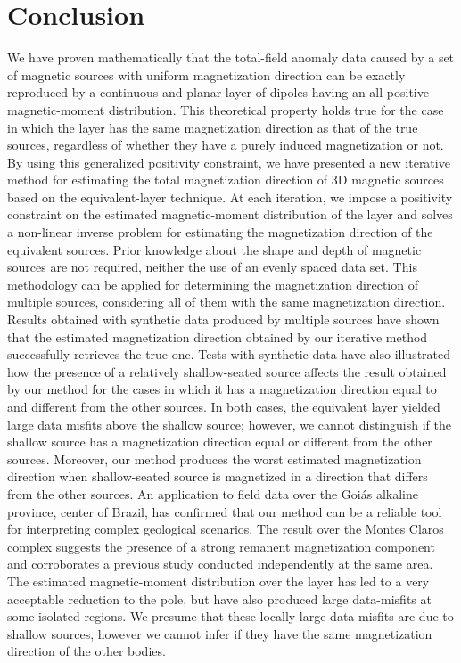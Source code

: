\section{Conclusion}
\label{sec:conclusion}

We have proven mathematically that the total-field anomaly data caused by a set of magnetic sources
with uniform magnetization direction can be exactly reproduced by a continuous and planar layer of 
dipoles having an all-positive magnetic-moment distribution. 
This theoretical property holds true for the case in which the layer has the same
magnetization direction as that of the true sources, regardless of whether they have 
a purely induced magnetization or not.
By using this generalized positivity constraint, we have presented a new iterative method for 
estimating the total magnetization direction of 3D magnetic sources based on the equivalent-layer technique. 
At each iteration, we impose a positivity constraint on the estimated magnetic-moment distribution of the layer 
and solves a non-linear inverse problem for estimating the magnetization direction of the equivalent sources. 
Prior knowledge about the shape and depth of magnetic sources are not required, neither the use of an evenly spaced 
data set. This methodology can be applied for determining the magnetization direction of multiple sources, 
considering all of them with the same magnetization direction. 
Results obtained with synthetic data produced by multiple sources have shown that the estimated magnetization direction 
obtained by our iterative method successfully retrieves the true one.
Tests with synthetic data have also illustrated how the presence of a relatively shallow-seated source affects the 
result obtained by our method for the cases in which it has a magnetization direction equal to and different from 
the other sources. In both cases, the equivalent layer yielded large data misfits above the shallow source;
however, we cannot distinguish if the shallow source has a magnetization direction equal or different from the other sources. 
Moreover, our method produces the worst estimated magnetization direction when shallow-seated source is magnetized in a 
direction that differs from the other sources.
An application to field data over the Goi{\' a}s alkaline province, center of Brazil, has confirmed that our method can 
be a reliable tool for interpreting complex geological scenarios. The result over the Montes Claros complex suggests the presence 
of a strong remanent magnetization component and corroborates a previous study conducted independently at the same area. 
The estimated magnetic-moment distribution over the layer has led to a very acceptable reduction to the pole, but have also 
produced large data-misfits at some isolated regions. We presume that these locally large data-misfits are due to shallow sources, 
however we cannot infer if they have the same magnetization direction of the other bodies.   
